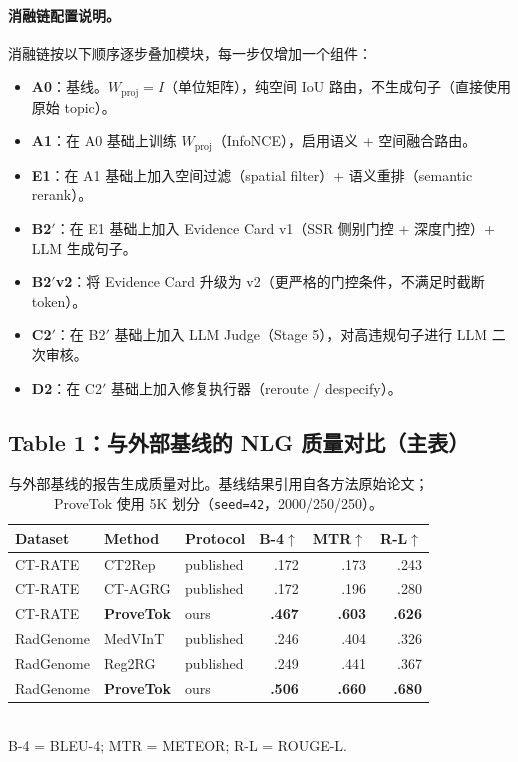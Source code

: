 \documentclass[11pt,a4paper]{article}
\theoremstyle{definition}
\begin{document}
\paragraph{消融链配置说明。}
消融链按以下顺序逐步叠加模块，每一步仅增加一个组件：
\begin{itemize}[nosep]
    \item \textbf{A0}：基线。$W_{\mathrm{proj}}=I$（单位矩阵），纯空间 IoU 路由，不生成句子（直接使用原始 topic）。
    \item \textbf{A1}：在 A0 基础上训练 $W_{\mathrm{proj}}$（InfoNCE），启用语义 + 空间融合路由。
    \item \textbf{E1}：在 A1 基础上加入空间过滤（spatial filter）+ 语义重排（semantic rerank）。
    \item \textbf{B2$'$}：在 E1 基础上加入 Evidence Card v1（SSR 侧别门控 + 深度门控）+ LLM 生成句子。
    \item \textbf{B2$'$v2}：将 Evidence Card 升级为 v2（更严格的门控条件，不满足时截断 token）。
    \item \textbf{C2$'$}：在 B2$'$ 基础上加入 LLM Judge（Stage 5），对高违规句子进行 LLM 二次审核。
    \item \textbf{D2}：在 C2$'$ 基础上加入修复执行器（reroute / despecify）。
\end{itemize}

\subsection{Table 1：与外部基线的 NLG 质量对比（主表）}

\begin{table}[H]
\centering
\caption{与外部基线的报告生成质量对比。基线结果引用自各方法原始论文；ProveTok 使用 5K 划分（\texttt{seed=42}，2000/250/250）。}\label{tab:main_comparison}
\footnotesize
\setlength{\tabcolsep}{4pt}
\begin{tabular}{@{}l l l r r r@{}}
\toprule
\textbf{Dataset} & \textbf{Method} & \textbf{Protocol} & \textbf{B-4}$\uparrow$ & \textbf{MTR}$\uparrow$ & \textbf{R-L}$\uparrow$ \\
\midrule
CT-RATE   & CT2Rep      & published & .172 & .173 & .243 \\
CT-RATE   & CT-AGRG     & published & .172 & .196 & .280 \\
CT-RATE   & \textbf{ProveTok} & ours & \textbf{.467} & \textbf{.603} & \textbf{.626} \\
\midrule
RadGenome & MedVInT     & published & .246 & .404 & .326 \\
RadGenome & Reg2RG      & published & .249 & .441 & .367 \\
RadGenome & \textbf{ProveTok} & ours & \textbf{.506} & \textbf{.660} & \textbf{.680} \\
\bottomrule
\end{tabular}
\\[4pt]
{\scriptsize B-4 = BLEU-4; MTR = METEOR; R-L = ROUGE-L.}
\end{table}
\end{document}
